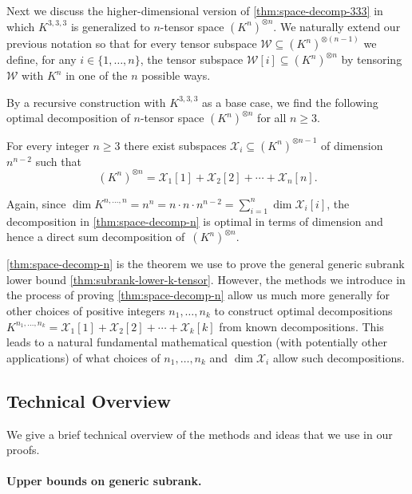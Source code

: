 \documentclass[11pt]{article}
\theoremstyle{definition}
\theoremstyle{remark}
\begin{document}
Next we discuss the higher-dimensional version of \autoref{thm:space-decomp-333} in which $K^{3,3,3}$ is generalized to $n$-tensor space $(K^n)^{\otimes n}$. We naturally extend our previous notation so that for every tensor subspace $\mathcal{W} \subseteq (K^n)^{\otimes (n-1)}$ we define, for any $i \in \{1, \ldots, n\}$, the tensor subspace $\mathcal{W}[i] \subseteq (K^n)^{\otimes n}$ by tensoring $\mathcal{W}$ with $K^n$ in one of the $n$ possible ways. 

By a recursive construction with $K^{3,3,3}$ as a base case, we find the following optimal decomposition of $n$-tensor space $(K^n)^{\otimes n}$ for all $n\geq3$.

\begin{theorem}\label{thm:space-decomp-n}
For every integer $n\geq 3$ there exist subspaces $\mathcal{X}_i \subseteq (K^n)^{\otimes n-1}$ of dimension~$n^{n-2}$ such that
\[
(K^n)^{\otimes n} = \mathcal{X}_1[1] + \mathcal{X}_2[2] + \cdots + \mathcal{X}_n[n].
\]
\end{theorem}
Again, since $\dim K^{n,\ldots, n} = n^n = n \cdot n\cdot n^{n-2} = \sum_{i=1}^n \dim \mathcal{X}_i[i]$, the decomposition in \autoref{thm:space-decomp-n} is optimal in terms of dimension and hence a direct sum decomposition of~$(K^n)^{\otimes n}$.

\autoref{thm:space-decomp-n} is the theorem we use to prove the general generic subrank lower bound \autoref{thm:subrank-lower-k-tensor}. However, the methods we introduce in the process of proving \autoref{thm:space-decomp-n} allow us much more generally for other choices of positive integers $n_1, \ldots, n_k$ to construct optimal decompositions $K^{n_1, \ldots, n_k} = \mathcal{X}_1[1] + \mathcal{X}_2[2] + \cdots + \mathcal{X}_k[k]$ from known decompositions. This leads to a natural fundamental mathematical question (with potentially other applications) of what choices of $n_1, \ldots, n_k$ and $\dim \mathcal{X}_i$ allow such decompositions.


\subsection{Technical Overview}\label{subsec:tech}

We give a brief technical overview of the methods and ideas that we use in our proofs. 

\paragraph{Upper bounds on generic subrank.}
\end{document}
